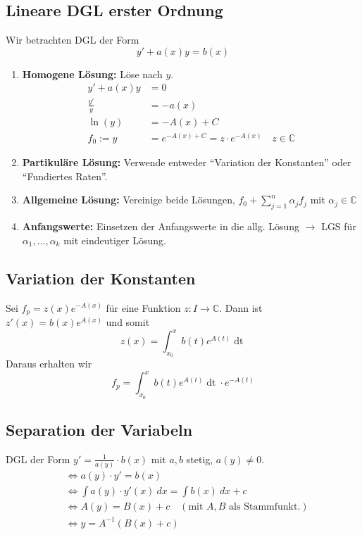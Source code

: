 \documentclass[a4paper,10pt]{article}
\def\C{\mathbb{C}}
\begin{document}
\subsection{Lineare DGL erster Ordnung}
Wir betrachten DGL der Form $$y' + a(x)y = b(x)$$
\begin{enumerate}[label=\textbf{\arabic*.}]
	\item \textbf{Homogene Lösung:} Löse nach $y$.
	      \begin{align*}
	      	y' + a(x)y   & = 0                                             \\
	      	\frac{y'}{y} & = -a(x)                                         \\
	      	\ln(y)       & = -A(x)+C                                       \\
	      	f_0 := y     & = e^{-A(x)+C} = z \cdot e^{-A(x)}\quad z \in \C 
	      \end{align*}
	\item \textbf{Partikuläre Lösung:} Verwende entweder ``Variation der Konstanten'' oder ``Fundiertes Raten''.
	\item \textbf{Allgemeine Lösung:} Vereinige beide Lösungen,
	      $f_{0}+ \sum\limits_{j=1}^{n}\alpha_{j}f_{j}$ mit $\alpha_{j} \in \mathbb{C}$
	\item \textbf{Anfangswerte:} Einsetzen der Anfangswerte in die allg. Lösung $\rightarrow$ LGS für $\alpha_{1},\dots,\alpha_{k}$ mit eindeutiger Lösung.
	        
\end{enumerate}
\subsection{Variation der Konstanten}
Sei $f_p = z(x)e^{-A(x)}$ für eine Funktion $z: I \to \C$. Dann ist $z'(x) = b(x) e^{A(x)}$ und somit $$z(x) = \int_{x_0}^x b(t) e^{A(t)} \mathop{dt}$$ Daraus erhalten wir $$f_p = \int_{x_0}^x b(t) e^{A(t)} \mathop{dt} \cdot e^{-A(t)}$$


\subsection{Separation der Variabeln}
DGL der Form $y'=\frac{1}{a(y)}\cdot b(x)$ mit $a,b$ stetig, $a(y)\neq 0$.  
\begin{align*}
	&\Longleftrightarrow a(y)\cdot y' = b(x)\\
	&\Longleftrightarrow \int a(y)\cdot y'(x)\ dx = \int b(x)\ dx + c\\
	&\Longleftrightarrow A(y) = B(x)+c \quad(\text{mit }A,B\text{ als Stammfunkt.})\\
	&\Longleftrightarrow y = A^{-1}(B(x)+c)
\end{align*}
\end{document}
